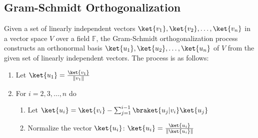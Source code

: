 \documentclass[12pt, oneside]{book}
\theoremstyle{definition}
\theoremstyle{definition}
\theoremstyle{remark}
\begin{document}
\subsection{Gram-Schmidt Orthogonalization}
Given a set of linearly independent vectors $\ket{v_1},\ket{v_2},\ldots,\ket{v_n}$ in a vector space $V$ over a field $\mathbb{F}$, the Gram-Schmidt orthogonalization process constructs an orthonormal basis $\ket{u_1},\ket{u_2},\ldots,\ket{u_n}$ of $V$ from the given set of linearly independent vectors. The process is as follows:
\begin{enumerate}
    \item Let $\ket{u_1}=\frac{\ket{v_1}}{\|v_1\|}$
    \item For $i=2,3,\ldots,n$ do
    \begin{enumerate}
        \item Let $\ket{u_i}=\ket{v_i}-\sum_{j=1}^{i-1}\braket{u_j|v_i}\ket{u_j}$
        \item Normalize the vector $\ket{u_i}$: $\ket{u_i}=\frac{\ket{u_i}}{\|\ket{u_i}\|}$
    \end{enumerate}
\end{enumerate}
\end{document}
